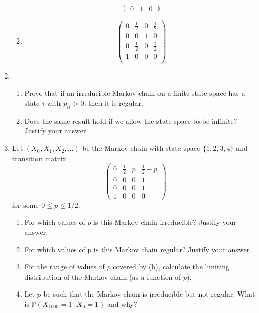 \documentclass[11pt,a4paper]{report}
\begin{document}
\begin{enumerate}
\begin{enumerate}
$$\begin{pmatrix}
                0 & 1 & 0
            \end{pmatrix}
            $$
            \item
            $$
            \begin{pmatrix}
                0 & \frac{1}{2} & 0 & \frac{1}{2}\\
                0 & 0 & 1 & 0\\
                0 & \frac{1}{2} & 0 & \frac{1}{2}\\
                1 & 0 & 0 & 0\\
            \end{pmatrix}
            $$
        \end{enumerate}
        \item 
        \begin{enumerate}
            \item Prove that if an irreducible Markov chain on a finite state space has a state $i$ with $p_{ii} > 0$, then it is regular.
            \item  Does the same result hold if we allow the state space to be infinite? Justify your answer.
        \end{enumerate}
        \item Let $(X_0, X_1, X_2, \ldots)$ be the Markov chain with state space $\{1, 2, 3,4\}$ and transition matrix
        $$
        \begin{pmatrix}
            0 & \frac{1}{2} & p & \frac{1}{2}-p\\
            0 & 0 & 0 & 1\\
            0 & 0 & 0 & 1\\
            1 & 0 & 0 & 0
        \end{pmatrix}
        $$
        for some $0 \leq p \leq 1/2$.
        \begin{enumerate}
            \item For which values of $p$ is this Markov chain irreducible? Justify your answer.
            \item For which values of p is this Markov chain regular? Justify your answer.
            \item For the range of values of $p$ covered by (b), calculate the limiting distribution of the Markov chain (as a function of $p$).
            \item Let $p$ be such that the Markov chain is irreducible but not regular. What is $\mathbb{P}(X_{1000} = 1\, | \, X_0 = 1)$ and why?
        \end{enumerate}

\end{enumerate}
\end{document}
